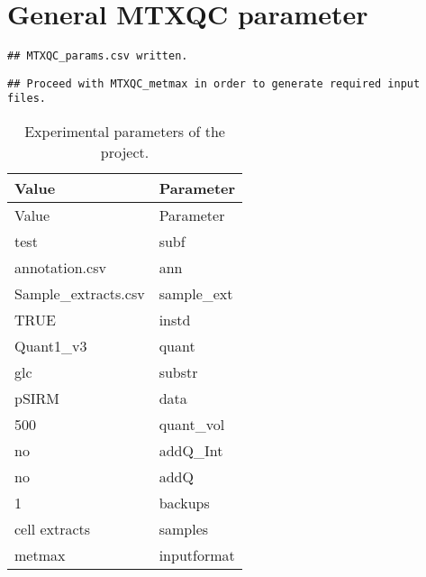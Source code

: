\documentclass[10pt,]{article}
\begin{document}
\section{General MTXQC parameter}\label{general-mtxqc-parameter}

\begin{verbatim}
## MTXQC_params.csv written.
\end{verbatim}

\begin{verbatim}
## Proceed with MTXQC_metmax in order to generate required input files.
\end{verbatim}

\begin{longtable}[]{@{}ll@{}}
\caption{Experimental parameters of the project.}\tabularnewline
\toprule
Value & Parameter\tabularnewline
\midrule
\endfirsthead
\toprule
Value & Parameter\tabularnewline
\midrule
\endhead
test & subf\tabularnewline
annotation.csv & ann\tabularnewline
Sample\_extracts.csv & sample\_ext\tabularnewline
TRUE & instd\tabularnewline
Quant1\_v3 & quant\tabularnewline
glc & substr\tabularnewline
pSIRM & data\tabularnewline
500 & quant\_vol\tabularnewline
no & addQ\_Int\tabularnewline
no & addQ\tabularnewline
1 & backups\tabularnewline
cell extracts & samples\tabularnewline
metmax & inputformat\tabularnewline
\bottomrule
\end{longtable}
\newpage
\singlespacing 
\end{document}
